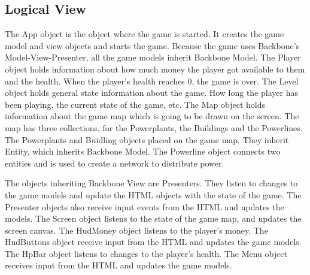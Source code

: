	\clearpage

\subsection*{Logical View}

	The App object is the object where the game is started. It creates the game model and view objects 
	and starts the game. Because the game uses Backbone's Model-View-Presenter, all the game models 
	inherit Backbone Model. The Player object holds information about how much money the player got 
	available to them and the health. When the player's health reaches 0, the game is over. The Level 
	object holds general state information about the game. How long the player has been playing, the 
	current state of the game, etc. The Map object holds information about the game map which is going 
	to be drawn on the screen. The map has three collections, for the Powerplants, the Buildings and 
	the Powerlines. The Powerplants and Buidling objects placed on the game map. They inherit Entity, 
	which inherits Backbone Model. The Powerline object connects two entities and is used to create a
	network to distribute power.

	The objects inheriting Backbone View are Presenters. They listen to changes to the game models and 
	update the HTML objects with the state of the game. The Presenter objects also receive input events
	from the HTML and updates the models. The Screen object listens to the state of the game map, and
	updates the screen canvas. The HudMoney object listens to the player's money. The HudButtons object 
	receive input from the HTML and updates the game models. The HpBar object listens to changes to the 
	player's health. The Menu object receives input from the HTML and updates the game models.

